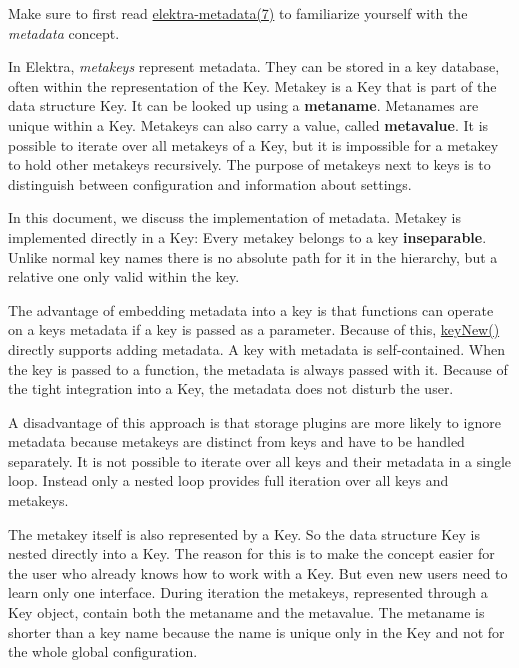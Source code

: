Make sure to first read \hyperlink{doc_help_elektra-metadata_md}{elektra-\/metadata(7)} to familiarize yourself with the {\itshape metadata} concept.

In Elektra, {\itshape metakeys} represent metadata. They can be stored in a key database, often within the representation of the {\ttfamily Key}. Metakey is a {\ttfamily Key} that is part of the data structure {\ttfamily Key}. It can be looked up using a {\bfseries metaname}. Metanames are unique within a {\ttfamily Key}. Metakeys can also carry a value, called {\bfseries metavalue}. It is possible to iterate over all metakeys of a {\ttfamily Key}, but it is impossible for a metakey to hold other metakeys recursively. The purpose of metakeys next to keys is to distinguish between configuration and information about settings.

In this document, we discuss the implementation of metadata. Metakey is implemented directly in a {\ttfamily Key}\+: Every metakey belongs to a key {\bfseries inseparable}. Unlike normal key names there is no absolute path for it in the hierarchy, but a relative one only valid within the key.

The advantage of embedding metadata into a key is that functions can operate on a key\textquotesingle{}s metadata if a key is passed as a parameter. Because of this, {\ttfamily \hyperlink{group__key_gad23c65b44bf48d773759e1f9a4d43b89}{key\+New()}} directly supports adding metadata. A key with metadata is self-\/contained. When the key is passed to a function, the metadata is always passed with it. Because of the tight integration into a {\ttfamily Key}, the metadata does not disturb the user.

A disadvantage of this approach is that storage plugins are more likely to ignore metadata because metakeys are distinct from keys and have to be handled separately. It is not possible to iterate over all keys and their metadata in a single loop. Instead only a nested loop provides full iteration over all keys and metakeys.

The metakey itself is also represented by a {\ttfamily Key}. So the data structure {\ttfamily Key} is nested directly into a {\ttfamily Key}. The reason for this is to make the concept easier for the user who already knows how to work with a {\ttfamily Key}. But even new users need to learn only one interface. During iteration the metakeys, represented through a {\ttfamily Key} object, contain both the metaname and the metavalue. The metaname is shorter than a key name because the name is unique only in the {\ttfamily Key} and not for the whole global configuration.

